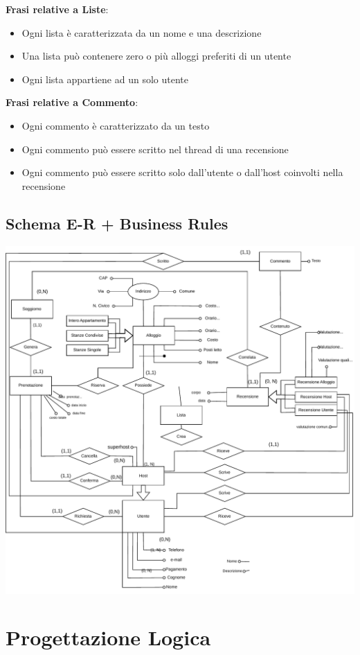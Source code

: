 \documentclass[letterpaper]{report}
\begin{document}
\bigskip
\textbf{Frasi relative a Liste}:
\begin{itemize}
    \item Ogni lista è caratterizzata da un nome e una descrizione
    \item Una lista può contenere zero o più alloggi preferiti di un utente
    \item Ogni lista appartiene ad un solo utente
\end{itemize}
\bigskip
\textbf{Frasi relative a Commento}:
\begin{itemize}
    \item Ogni commento è caratterizzato da un testo
    \item Ogni commento può essere scritto nel thread di una recensione
    \item Ogni commento può essere scritto solo dall'utente o dall'host coinvolti nella recensione
\end{itemize}

\newpage
\section{Schema E-R + Business Rules}
\includegraphics[width=\textwidth]{resources/ER.pdf}

\chapter{Progettazione Logica}
\end{document}
